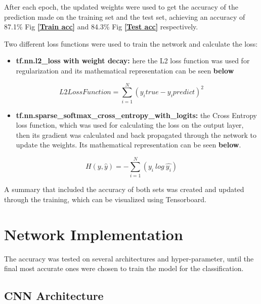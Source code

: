 \documentclass{article}
\begin{document}
\begin{adjustwidth}{-40pt}{-40pt}
After each epoch, the updated weights were used to get the accuracy of the prediction made on the training set and the test set, achieving an accuracy of 87.1\% Fig \textcolor{blue}{\textbf{\ref{Train acc}}} and 84.3\% Fig \textcolor{blue}{\textbf{\ref{Test acc}}} respectively.

Two different loss functions were used to train the network and calculate the loss:
\newpage
\begin{itemize}
\item \textbf{tf.nn.l2\_loss with weight decay:} here the L2 loss function was used for regularization and its mathematical representation can be seen \textbf{below}
\end{itemize}

\begin{equation}
L2LossFunction =  \sum_{i=1}^{N}(y_i true - y_i predict)^2
\end{equation}

\begin{itemize}
\item \textbf{tf.nn.sparse\_softmax\_cross\_entropy\_with\_logits:} the Cross Entropy loss function, which was used for calculating the loss on the output layer, then its gradient was calculated and back propagated through the network to update the weights. Its mathematical representation can be seen \textbf{below}.
\end{itemize}

\begin{equation}
H(y,\hat{y})=-\sum_{i=1}^{N}(y_i \ log \ \hat{y_i})
\end{equation}

A summary that included the accuracy of both sets was created and updated through the training, which can be visualized using Tensorboard.



\section{Network Implementation}

The accuracy was tested on several architectures and hyper-parameter, until the final most accurate ones were chosen to train the model for the classification.

\subsection{CNN Architecture}


\end{adjustwidth}
\end{document}
